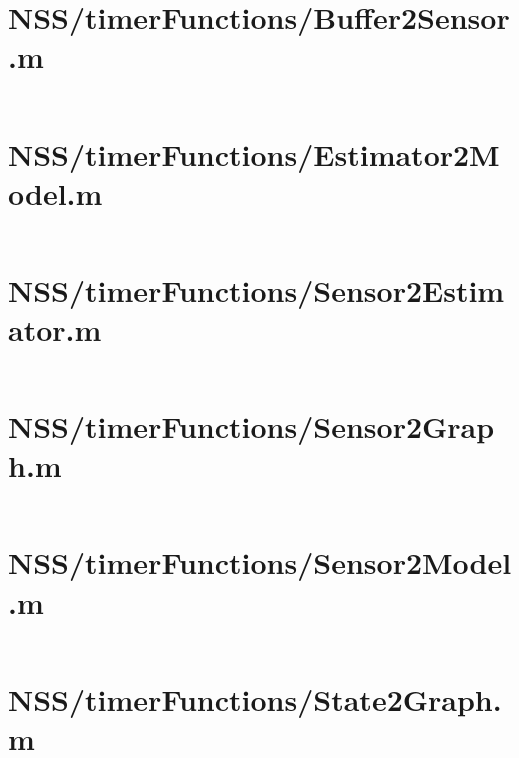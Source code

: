 \pagebreak
\section*{NSS/timerFunctions/Buffer2Sensor.m}\label{code:NSS/timerFunctions/Buffer2Sensor.m}
\inputminted[linenos,fontsize=\scriptsize]{matlab}{/home/dcouture/git/mathyourlife/TSatPy/beta_versions/matlab_object_oriented/timerFunctions/Buffer2Sensor.m}

\pagebreak
\section*{NSS/timerFunctions/Estimator2Model.m}\label{code:NSS/timerFunctions/Estimator2Model.m}
\inputminted[linenos,fontsize=\scriptsize]{matlab}{/home/dcouture/git/mathyourlife/TSatPy/beta_versions/matlab_object_oriented/timerFunctions/Estimator2Model.m}

\pagebreak
\section*{NSS/timerFunctions/Sensor2Estimator.m}\label{code:NSS/timerFunctions/Sensor2Estimator.m}
\inputminted[linenos,fontsize=\scriptsize]{matlab}{/home/dcouture/git/mathyourlife/TSatPy/beta_versions/matlab_object_oriented/timerFunctions/Sensor2Estimator.m}

\pagebreak
\section*{NSS/timerFunctions/Sensor2Graph.m}\label{code:NSS/timerFunctions/Sensor2Graph.m}
\inputminted[linenos,fontsize=\scriptsize]{matlab}{/home/dcouture/git/mathyourlife/TSatPy/beta_versions/matlab_object_oriented/timerFunctions/Sensor2Graph.m}

\pagebreak
\section*{NSS/timerFunctions/Sensor2Model.m}\label{code:NSS/timerFunctions/Sensor2Model.m}
\inputminted[linenos,fontsize=\scriptsize]{matlab}{/home/dcouture/git/mathyourlife/TSatPy/beta_versions/matlab_object_oriented/timerFunctions/Sensor2Model.m}

\pagebreak
\section*{NSS/timerFunctions/State2Graph.m}\label{code:NSS/timerFunctions/State2Graph.m}
\inputminted[linenos,fontsize=\scriptsize]{matlab}{/home/dcouture/git/mathyourlife/TSatPy/beta_versions/matlab_object_oriented/timerFunctions/State2Graph.m}


